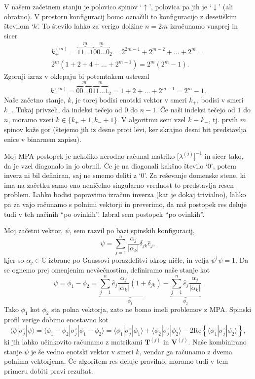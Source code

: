 \documentclass[12pt, a4 paper]{article}
\begin{document}
V na\v sem za\v cetnem stanju je polovico spinov `$\uparrow$', polovica pa jih je `$\downarrow$' (ali obratno). V prostoru
konfiguracij bomo ozna\v cili to konfiguracijo z deseti\v skim \v stevilom `$k$'. To \v stevilo lahko za verigo dol\v zine
$n = 2m$ izra\v cunamo vnaprej in sicer
\begin{multline}
	k_+^{(m)} = \overbrace{11\ldots1}^{m}\overbrace{00\ldots0}^{m}{}_2 = 2^{2m-1} + 2^{m-2} + \ldots + 2^m = \\
		2^m(1 + 2 + 4 + \ldots + 2^{m-1}) = 2^m (2^m - 1).
\end{multline}
Zgornji izraz v oklepaju bi potemtakem ustrezal
\begin{equation}
	k_-^{(m)} = \overbrace{00\ldots0}^{m}\overbrace{11\ldots1}^{m}{}_2 = 1 + 2 + \ldots + 2^{m-1} = 2^m-1.
\end{equation}
Na\v se za\v cetno stanje, $k$, je torej bodisi enotski vektor v smeri $k_+$, bodisi v smeri $k_-$. Tukaj privzeli, da
indeksi te\v cejo od $0$ do $n-1$. \v Ce na\v si indeksi te\v cejo od $1$ do $n$, moramo vzeti
$k \in \{k_+ + 1, k_- + 1\}$. V algoritmu sem vzel $k \equiv k_-$, tj. prvih $m$ spinov ka\v ze gor (\v stejemo jih iz
desne proti levi, ker skrajno desni bit predstavlja enice v binarnem zapisu).

Moj MPA postopek je nekoliko nerodno ra\v cunal matriko $\big[\lambda^{(j)}\big]^{-1}$ in sicer tako, da je vzel diagonalo
in jo obrnil. \v Ce je na diagonali kak\v sno \v stevilo `$0$', potem inverz ni bil definiran, saj ne smemo deliti z `$0$'. Za
re\v sevanje domenske stene, ki ima na za\v cetku samo eno neni\v celno singularno vrednost to predstavlja resen problem.
Lahko bodisi popravimo izra\v cun inverza (kar je dokaj trivialno), lahko pa za vajo ra\v cunamo s polnimi vektorji in
preverimo, da na\v s postopek res deluje tudi v teh na\v cinih "`po ovinkih"'. Izbral sem postopek "`po ovinkih"'.

Moj za\v cetni vektor, $\psi$, sem razvil po bazi spinskih konfiguracij,
\[
	\psi = \sum_{j=1}^n\frac{\alpha_j}{|\alpha_k|}\delta_{jk}\hat{e}_j,
\]
kjer so $\alpha_j \in \mathbb{C}$ izbrane po Gaussovi porazdelitvi okrog ni\v cle, in velja $\psi^\dagger \psi = 1$.
Da se ognemo prej omenjenim nev\v se\v cnostim, definiramo na\v se stanje kot
\[
	\psi = \phi_1 - \phi_2 = \underbrace{\sum_{j = 1}^n\hat{e}_j \frac{\alpha_j}{|\alpha_k|}(1 + \delta_{jk})}_{\phi_1}
		- \underbrace{\sum_{j=1}^n\hat{e}_j \frac{\alpha_j}{|\alpha_k|}}_{\phi_2}.
\]
Tako $\phi_1$ kot $\phi_2$ sta polna vektorja, zato ne bomo imeli problemov z MPA. Spinski profil verige dobimo enostavno
kot
\[
	\langle\psi|\sigma^z_j|\psi\rangle = \langle\phi_1 - \phi_2|\sigma^z_j|\phi_1 - \phi_2\rangle =
	\langle\phi_1|\sigma^z_j|\phi_1\rangle + \langle\phi_2|\sigma_j^z|\phi_2\rangle - 2\mathrm{Re}\left\{
	\langle\phi_1|\sigma^z_j|\phi_2\rangle\right\},
\]
ki jih lahko u\v cinkovito ra\v cunamo z matrikami $\mathbf{T}^{(j)}$ in $\mathbf{V}^{(j)}$. Na\v se kombinirano stanje
$\psi$ je \v se vedno enotski vektor v smeri $k$, vendar ga ra\v cunamo z dvema polnima vektorjema.
\v Ce algoritem res deluje pravilno, moramo tudi v tem primeru dobiti pravi rezultat.
\end{document}
